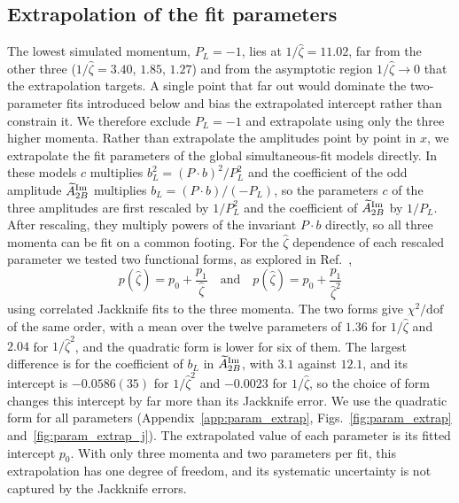 \subsection{Extrapolation of the fit parameters}
\label{sec:zeta_extrapolation}

The lowest simulated momentum, $P_L=-1$, lies at $1/\hat\zeta=11.02$, far from the other three ($1/\hat\zeta=3.40$, $1.85$, $1.27$) and from the asymptotic region $1/\hat\zeta\to0$ that the extrapolation targets. A single point that far out would dominate the two-parameter fits introduced below and bias the extrapolated intercept rather than constrain it. We therefore exclude $P_L=-1$ and extrapolate using only the three higher momenta. Rather than extrapolate the amplitudes point by point in $x$, we extrapolate the fit parameters of the global simultaneous-fit models directly. In these models $c$ multiplies $b_L^2=(P\cdot b)^2/P_L^2$ and the coefficient of the odd amplitude $\widetilde{A}_{2B}^{\text{Im}}$ multiplies $b_L=(P\cdot b)/(-P_L)$, so the parameters $c$ of the three amplitudes are first rescaled by $1/P_L^2$ and the coefficient of $\widetilde{A}_{2B}^{\text{Im}}$ by $1/P_L$. After rescaling, they multiply powers of the invariant $P\cdot b$ directly, so all three momenta can be fit on a common footing. For the $\hat\zeta$ dependence of each rescaled parameter we tested two functional forms, as explored in Ref.~\cite{Musch:2011er},
\begin{equation}
p(\hat\zeta)=p_0+\frac{p_1}{\hat\zeta}\quad\text{and}\quad p(\hat\zeta)=p_0+\frac{p_1}{\hat\zeta^{2}}
\label{eq:zeta_ansatz}
\end{equation}
using correlated Jackknife fits to the three momenta. The two forms give $\chi^2/\text{dof}$ of the same order, with a mean over the twelve parameters of $1.36$ for $1/\hat\zeta$ and $2.04$ for $1/\hat\zeta^2$, and the quadratic form is lower for six of them. The largest difference is for the coefficient of $b_L$ in $\widetilde{A}_{2B}^{\text{Im}}$, with $3.1$ against $12.1$, and its intercept is $-0.0586(35)$ for $1/\hat\zeta^2$ and $-0.0023$ for $1/\hat\zeta$, so the choice of form changes this intercept by far more than its Jackknife error. We use the quadratic form for all parameters (Appendix~\ref{app:param_extrap}, Figs.~\ref{fig:param_extrap} and~\ref{fig:param_extrap_j}). The extrapolated value of each parameter is its fitted intercept $p_0$. With only three momenta and two parameters per fit, this extrapolation has one degree of freedom, and its systematic uncertainty is not captured by the Jackknife errors.


